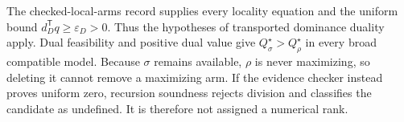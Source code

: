 The checked-local-arms record supplies every locality equation and the uniform bound \(d_D^{\mathsf T}q\geq\varepsilon_D>0\).  Thus the hypotheses of transported dominance duality apply.  Dual feasibility and positive dual value give \(Q_\sigma^\star>Q_\rho^\star\) in every broad compatible model.  Because \(\sigma\) remains available, \(\rho\) is never maximizing, so deleting it cannot remove a maximizing arm.  If the evidence checker instead proves uniform zero, recursion soundness rejects division and classifies the candidate as undefined.  It is therefore not assigned a numerical rank.